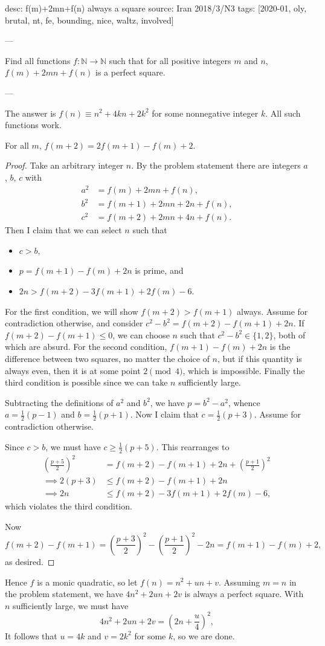 desc: f(m)+2mn+f(n) always a square
source: Iran 2018/3/N3
tags: [2020-01, oly, brutal, nt, fe, bounding, nice, waltz, involved]

---

Find all functions $f:\mathbb N\to\mathbb N$ such that for all positive integers $m$ and $n$, $f(m)+2mn+f(n)$ is a perfect square.

---

The answer is $f(n)\equiv n^2+4kn+2k^2$ for some nonnegative integer $k$. All such functions work.
\begin{claim*}
    For all $m$, $f(m+2)=2f(m+1)-f(m)+2$.
\end{claim*}
\begin{proof}
    Take an arbitrary integer $n$. By the problem statement there are integers $a$, $b$, $c$ with
    \begin{align*}
        a^2&=f(m)+2mn+f(n),\\
        b^2&=f(m+1)+2mn+2n+f(n),\\
        c^2&=f(m+2)+2mn+4n+f(n).
    \end{align*}
    Then I claim that we can select $n$ such that
    \begin{itemize}[itemsep=0em]
        \item $c>b$,
        \item $p=f(m+1)-f(m)+2n$ is prime, and
        \item $2n>f(m+2)-3f(m+1)+2f(m)-6$.
    \end{itemize}
    For the first condition, we will show $f(m+2)>f(m+1)$ always. Assume for contradiction otherwise, and consider $c^2-b^2=f(m+2)-f(m+1)+2n$. If $f(m+2)-f(m+1)\le0$, we can choose $n$ such that $c^2-b^2\in\{1,2\}$, both of which are absurd. For the second condition, $f(m+1)-f(m)+2n$ is the difference between two squares, no matter the choice of $n$, but if this quantity is always even, then it is at some point $2\pmod4$, which is impossible. Finally the third condition is possible since we can take $n$ sufficiently large.

    Subtracting the definitions of $a^2$ and $b^2$, we have $p=b^2-a^2$, whence $a=\tfrac12(p-1)$ and $b=\tfrac12(p+1)$. Now I claim that $c=\tfrac12(p+3)$. Assume for contradiction otherwise.

    Since $c>b$, we must have $c\ge\tfrac12(p+5)$. This rearranges to
    \begin{align*}
        \left(\frac{p+5}2\right)^2&=f(m+2)-f(m+1)+2n+\left(\frac{p+1}2\right)^2\\
        \implies2(p+3)&\le f(m+2)-f(m+1)+2n\\
        \implies 2n&\le f(m+2)-3f(m+1)+2f(m)-6,
    \end{align*}
    which violates the third condition.

    Now \[f(m+2)-f(m+1)=\left(\frac{p+3}2\right)^2-\left(\frac{p+1}2\right)^2-2n=f(m+1)-f(m)+2,\]
    as desired.
\end{proof}

Hence $f$ is a monic quadratic, so let $f(n)=n^2+un+v$. Assuming $m=n$ in the problem statement, we have $4n^2+2un+2v$ is always a perfect square. With $n$ sufficiently large, we must have \[4n^2+2un+2v=\left(2n+\frac u4\right)^2,\]
It follows that $u=4k$ and $v=2k^2$ for some $k$, so we are done.

